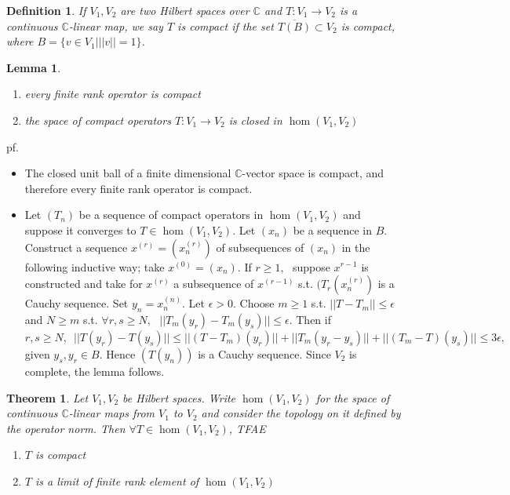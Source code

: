 \documentclass[12pt,letterpaper]{report}
\newtheorem{definition}{Definition}[section]
\newtheorem{lemma}{Lemma}[section]
\newtheorem{theorem}{Theorem}[section]
\begin{document}
\begin{definition}If $V_{1},V_{2}$ are two Hilbert spaces over $\mathbb{C}$ and $T:V_{1}\rightarrow V_{2}$ is a continuous $\mathbb{C}$-linear map, we say $T$ is compact if the set $\overline{T(B)}\subset V_{2}$ is compact, where $B=\{v\in V_{1}|||v||=1\}$.\end{definition}
\begin{lemma}\begin{enumerate}\item every finite rank operator is compact
\item the space of compact operators $T:V_{1}\rightarrow V_{2}$ is closed in $\hom(V_{1},V_{2})$\end{enumerate}\end{lemma}
pf.\begin{itemize}
\item The closed unit ball of a finite dimensional $\mathbb{C}$-vector space is compact, and therefore every finite rank operator is compact. 
\item Let $(T_{n})$ be a sequence of compact operators in $\hom(V_{1},V_{2})$ and suppose it converges to $T\in\hom(V_{1},V_{2})$. Let $(x_{n})$ be a sequence in $B$. Construct a sequence $x^{(r)}=(x_{n}^{(r)})$ of subsequences of $(x_{n})$ in the following inductive way; take $x^{(0)}=(x_{n})$. If $r\geq1,\,\,$ suppose $x^{r-1}$ is constructed and take for $x^{(r)}$ a subsequence of $x^{(r-1)}$ s.t. $(T_{r}(x_{n}^{(r)})$ is a Cauchy sequence. Set $y_{n}=x_{n}^{(n)}$. Let $\epsilon>0$. Choose $m\geq1$ s.t. $||T-T_{m}||\leq \epsilon$ and $N\geq m$ s.t. $\forall r,s\geq N,\,\,\,\,||T_{m}(y_{r})-T_{m}(y_{s})||\leq\epsilon$. Then if $r,s\geq N,\,\,\,||T(y_{r})-T(y_{s})||\leq||(T-T_{m})(y_{r})||+||T_{m}(y_{r}-y_{s})||+||(T_{m}-T)(y_{s})||\leq 3\epsilon,$ given $y_{s},y_{r}\in B$. Hence $(T(y_{n}))$ is a Cauchy sequence. Since $V_{2}$ is complete, the lemma follows. 


\end{itemize}
\begin{theorem}Let $V_{1},V_{2}$ be Hilbert spaces. Write $\hom(V_{1},V_{2})$ for the space of continuous $\mathbb{C}$-linear maps from $V_{1}$ to $V_{2}$ and consider the topology on it defined by the operator norm. Then $\forall T\in\hom(V_{1},V_{2})$, TFAE\begin{enumerate}\item $T$ is compact\item $T$ is a limit of finite rank element of $\hom(V_{1},V_{2})$\end{enumerate}\end{theorem}
\end{document}
